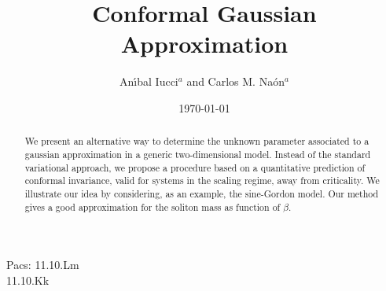 \documentclass[a4paper,12pt]{article}
\begin{document}
\thispagestyle{empty}
\newcommand{\unmedio}{{\scriptstyle\frac{1}{2}}}
\newcommand{\eff}{_{\text{eff}}}
\newcommand{\Infinity}{\infty}
\newcommand{\flip}{_{\text{flip}}}
\newcommand{\bos}{_{0\text{B}}}
\newcommand{\bosonic}{_{\text{bos}}}
\newcommand{\ferm}{_{0\text{F}}}
\newcommand{\trial}{_{\text{trial}}}
\newcommand{\true}{_{\text{true}}}
\newcommand{\Ci}{\operatorname{Ci}}
\newcommand{\tr}{\operatorname{tr}}

\newcommand{\PsiB}{\bar{\Psi}}   %
\newcommand{\phiH}{\hat{\phi}}
\newcommand{\etaH}{\hat{\eta}}
\newcommand{\chiB}{\bar{\chi}}
\newcommand{\xiH}{\hat{\xi}}
\newcommand{\zetaH}{\hat{\zeta}}
\newcommand{\vH}{\hat{v}}
\newcommand{\bH}{\hat{b}}

\newcommand{\AB}{\bar{A}_\mu}
\newcommand{\BB}{\bar{B}_\mu}
\newcommand{\AT}{\tilde{A}_\mu}
\newcommand{\BT}{\tilde{B}_\mu}

\newcommand{\slp}{\raise.15ex\hbox{$/$}\kern-.57em\hbox{$\partial$}}
\newcommand{\slA}{\raise.15ex\hbox{$/$}\kern-.63em\hbox{$A$}}

\newcommand{\difp}{\frac{d^2p}{(2\pi)^2}\,}

\newcommand{\bra}{\left\langle}
\newcommand{\ket}{\right\rangle}
\newcommand{\bracket}{\left\langle\,\right\rangle}

\newcommand{\D}{\mathcal{D}}
\newcommand{\N}{\mathcal{N}}
\newcommand{\Lag}{\mathcal{L}}
\newcommand{\V}{\mathcal{V}}
\newcommand{\Z}{\mathcal{Z}}






\title{Conformal Gaussian Approximation}
\author{An\'{\i}bal Iucci$^a$ and Carlos M. Na\'on$^a$}
\date{\today}



\maketitle
\begin{abstract}
We present an alternative way to determine the unknown parameter associated to a
gaussian approximation in a generic two-dimensional model. Instead of the standard
variational approach, we propose a procedure based on a quantitative prediction of
conformal invariance, valid for systems in the scaling regime, away from criticality.
We illustrate our idea by considering, as an example, the sine-Gordon model. Our
method gives a good approximation for the soliton mass as function of $\beta$.
\end{abstract}
\vspace{3cm} Pacs: 11.10.Lm\\ \hspace*{1,7 cm} 11.10.Kk
\end{document}

